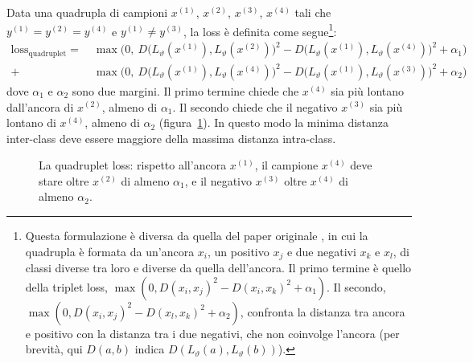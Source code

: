 Data una quadrupla di campioni $x^{(1)}$, $x^{(2)}$, $x^{(3)}$, $x^{(4)}$ tali che $y^{(1)} = y^{(2)} = y^{(4)}$ e $y^{(1)} \neq y^{(3)}$, la loss è definita come segue\footnote{Questa formulazione è diversa da quella del paper originale \cite{Chen2017}, in cui la quadrupla è formata da un'ancora $x_i$, un positivo $x_j$ e due negativi $x_k$ e $x_l$, di classi diverse tra loro e diverse da quella dell'ancora. Il primo termine è quello della triplet loss, $\max(0, D(x_i, x_j)^2 - D(x_i, x_k)^2 + \alpha_1)$. Il secondo, $\max(0, D(x_i, x_j)^2 - D(x_l, x_k)^2 + \alpha_2)$, confronta la distanza tra ancora e positivo con la distanza tra i due negativi, che non coinvolge l'ancora (per brevità, qui $D(a, b)$ indica $D(L_\vartheta(a), L_\vartheta(b))$).}:
\begin{align*}
\mathrm{loss}_{\mathrm{quadruplet}} = \ &\max\Big(0,\ D\big(L_\vartheta(x^{(1)}), L_\vartheta(x^{(2)})\big)^2 - D\big(L_\vartheta(x^{(1)}), L_\vartheta(x^{(4)})\big)^2 + \alpha_1\Big) \\
+ \ &\max\Big(0,\ D\big(L_\vartheta(x^{(1)}), L_\vartheta(x^{(4)})\big)^2 - D\big(L_\vartheta(x^{(1)}), L_\vartheta(x^{(3)})\big)^2 + \alpha_2\Big)
\end{align*}
dove $\alpha_1$ e $\alpha_2$ sono due margini. Il primo termine chiede che $x^{(4)}$ sia più lontano dall'ancora di $x^{(2)}$, almeno di $\alpha_1$. Il secondo chiede che il negativo $x^{(3)}$ sia più lontano di $x^{(4)}$, almeno di $\alpha_2$ (figura~\ref{fig:quadruplet}). In questo modo la minima distanza inter-class deve essere maggiore della massima distanza intra-class.

\begin{figure}[htbp]
\centering
{}
\caption{La quadruplet loss: rispetto all'ancora $x^{(1)}$, il campione $x^{(4)}$ deve stare oltre $x^{(2)}$ di almeno $\alpha_1$, e il negativo $x^{(3)}$ oltre $x^{(4)}$ di almeno $\alpha_2$.}
\label{fig:quadruplet}
\end{figure}

